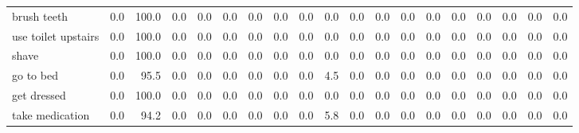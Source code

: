\documentclass{article}
\begin{document}
\begin{sideways}
\begin{tabular}{lrrrrrrrrrrrrrrrrrr}
brush teeth                   &         0.0 &              100.0 &           0.0 &                          0.0 &                0.0 &                0.0 &                        0.0 &          0.0 &              0.0 &                0.0 &                    0.0 &                      0.0 &                  0.0 &                   0.0 &              0.0 &              0.0 &                                  0.0 &          0.0 \\
use toilet upstairs           &         0.0 &              100.0 &           0.0 &                          0.0 &                0.0 &                0.0 &                        0.0 &          0.0 &              0.0 &                0.0 &                    0.0 &                      0.0 &                  0.0 &                   0.0 &              0.0 &              0.0 &                                  0.0 &          0.0 \\
shave                         &         0.0 &              100.0 &           0.0 &                          0.0 &                0.0 &                0.0 &                        0.0 &          0.0 &              0.0 &                0.0 &                    0.0 &                      0.0 &                  0.0 &                   0.0 &              0.0 &              0.0 &                                  0.0 &          0.0 \\
go to bed                     &         0.0 &               95.5 &           0.0 &                          0.0 &                0.0 &                0.0 &                        0.0 &          0.0 &              4.5 &                0.0 &                    0.0 &                      0.0 &                  0.0 &                   0.0 &              0.0 &              0.0 &                                  0.0 &          0.0 \\
get dressed                   &         0.0 &              100.0 &           0.0 &                          0.0 &                0.0 &                0.0 &                        0.0 &          0.0 &              0.0 &                0.0 &                    0.0 &                      0.0 &                  0.0 &                   0.0 &              0.0 &              0.0 &                                  0.0 &          0.0 \\
take medication               &         0.0 &               94.2 &           0.0 &                          0.0 &                0.0 &                0.0 &                        0.0 &          0.0 &              5.8 &                0.0 &                    0.0 &                      0.0 &                  0.0 &                   0.0 &              0.0 &              0.0 &                                  0.0 &          0.0 \\

\end{tabular}
\end{sideways}
\end{document}
